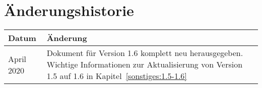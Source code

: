 \chapter{Änderungshistorie}
\begin{tabularx}{\textwidth}{l|X}
  Datum & Änderung \\
  \hline
  \hline
  April 2020 &
    Dokument für Version 1.6 komplett neu herausgegeben.\newline
    Wichtige Informationen zur Aktualisierung von Version 1.5 auf 1.6 in Kapitel~\ref{sonstiges:1.5-1.6}
\end{tabularx}

